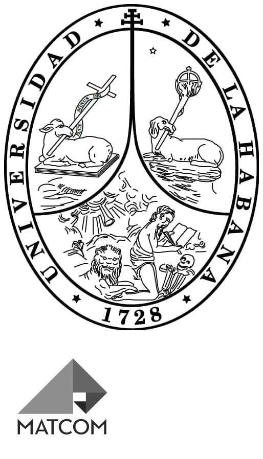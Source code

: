 
\begin{titlepage}

 \begin{center}
 \includegraphics[width=0.1\linewidth]{images/logoUH.jpg}
 \end{center}
 \TitleBlock{\scshape\insertinstitution \\[0.5cm]}


 \TitleBlock{\Huge \bfseries \slshape \inserttitle \\[1cm]}

 
 \begin{center}
 \end{center}

\begin{center}
\includegraphics[width=0.1\linewidth]{images/logoMatcom.jpg}
\TitleBlock{\scshape \insertfaculty}
\TitleBlock{\insertdepartment}
\TitleBlock{\insertsubmitdate}
\end{center}
  
  
  
  
\end{titlepage}

